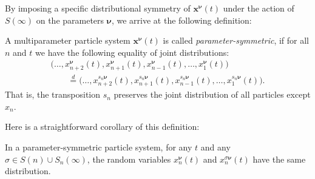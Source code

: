 By imposing a specific distributional symmetry
of $\mathbf{x}^{{\boldsymbol \nu}}(t)$
under the action of $S(\infty)$
on the parameters ${\boldsymbol \nu}$, we arrive at the following definition:

\begin{Definition}
	\label{def:symm_IPS}
	A multiparameter particle system $\mathbf{x}^{{\boldsymbol \nu}}(t)$ is called \emph{parameter-symmetric},
	if for all $n$ and $t$ we have
	the following equality of joint distributions:
\begin{gather}
\big(\ldots,x_{n+2}^{{\boldsymbol \nu}}(t),x_{n+1}^{{\boldsymbol \nu}}(t),
x_{n-1}^{{\boldsymbol \nu}}(t),\ldots, x_1^{{\boldsymbol \nu}}(t)\big)\nonumber
\\ \qquad
{}\stackrel{d}{=}\big(\ldots,x_{n+2}^{s_n{\boldsymbol \nu}}(t),x_{n+1}^{s_n{\boldsymbol \nu}}(t),
x_{n-1}^{s_n{\boldsymbol \nu}}(t),\ldots,x_1^{s_n{\boldsymbol \nu}}(t)\big).
\label{eq:symm_IPS}
\end{gather}
	That is, the transposition $s_n$ preserves the joint
	distribution of all particles except $x_n$.
\end{Definition}
Here is a straightforward corollary of this definition:
\begin{Corollary}
	In a parameter-symmetric particle system,
	for any $t$ and any $\sigma\in S(n)\cup S_{n}(\infty)$, the
	random variables
	$x_n^{{\boldsymbol \nu}}(t)$ and
	$x_n^{\sigma {\boldsymbol \nu}}(t)$
	have the same distribution.
\end{Corollary}

